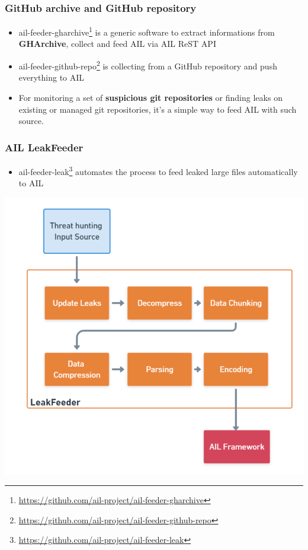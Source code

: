 \begin{frame}[fragile]
    \frametitle{GitHub archive and GitHub repository}
    \begin{itemize}
        \item ail-feeder-gharchive\footnote{\url{https://github.com/ail-project/ail-feeder-gharchive}} is a generic software to extract informations from {\bf GHArchive}, collect and feed AIL via AIL ReST API
        \item ail-feeder-github-repo\footnote{\url{https://github.com/ail-project/ail-feeder-github-repo}} is collecting from a GitHub repository and push everything to AIL
        \item For monitoring a set of {\bf suspicious git repositories} or finding leaks on existing or managed git repositories, it's a simple way to feed AIL with such source.
    \end{itemize}
\end{frame}

\begin{frame}[fragile]
    \frametitle{AIL LeakFeeder}
    \begin{itemize}
        \item ail-feeder-leak\footnote{\url{https://github.com/ail-project/ail-feeder-leak}} automates the process to feed leaked large files automatically to AIL
    \end{itemize}
    \includegraphics[scale=0.20]{./images/feeder_leak.png}
\end{frame}

